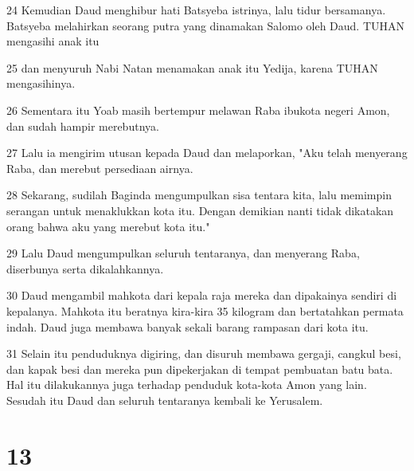 \par 24 Kemudian Daud menghibur hati Batsyeba istrinya, lalu tidur bersamanya. Batsyeba melahirkan seorang putra yang dinamakan Salomo oleh Daud. TUHAN mengasihi anak itu
\par 25 dan menyuruh Nabi Natan menamakan anak itu Yedija, karena TUHAN mengasihinya.
\par 26 Sementara itu Yoab masih bertempur melawan Raba ibukota negeri Amon, dan sudah hampir merebutnya.
\par 27 Lalu ia mengirim utusan kepada Daud dan melaporkan, "Aku telah menyerang Raba, dan merebut persediaan airnya.
\par 28 Sekarang, sudilah Baginda mengumpulkan sisa tentara kita, lalu memimpin serangan untuk menaklukkan kota itu. Dengan demikian nanti tidak dikatakan orang bahwa aku yang merebut kota itu."
\par 29 Lalu Daud mengumpulkan seluruh tentaranya, dan menyerang Raba, diserbunya serta dikalahkannya.
\par 30 Daud mengambil mahkota dari kepala raja mereka dan dipakainya sendiri di kepalanya. Mahkota itu beratnya kira-kira 35 kilogram dan bertatahkan permata indah. Daud juga membawa banyak sekali barang rampasan dari kota itu.
\par 31 Selain itu penduduknya digiring, dan disuruh membawa gergaji, cangkul besi, dan kapak besi dan mereka pun dipekerjakan di tempat pembuatan batu bata. Hal itu dilakukannya juga terhadap penduduk kota-kota Amon yang lain. Sesudah itu Daud dan seluruh tentaranya kembali ke Yerusalem.

\chapter{13}

